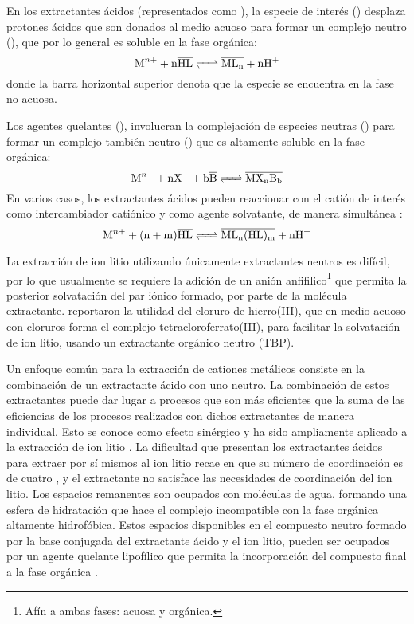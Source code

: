 En los extractantes ácidos (representados como ), la especie de interés () desplaza protones ácidos que son donados al medio acuoso para formar un complejo neutro (), que por lo general es soluble en la fase orgánica:
\begin{equation}
    \ce{M^{n+} + n\overline{HL} <=> \overline{ML_n} + nH^+}
\end{equation}
donde la barra horizontal superior denota que la especie se encuentra en la fase no acuosa. 

Los agentes quelantes (), involucran la complejación de especies neutras () para formar un complejo también neutro () que es altamente soluble en la fase orgánica:
\begin{equation}
    \ce{M^{n+} + nX^{-} + b\overline{B} <=> \overline{MX_nB_b}}
\end{equation}
En varios casos, los extractantes ácidos pueden reaccionar con el catión de interés como intercambiador catiónico y como agente solvatante, de manera simultánea \citep{Swain2016}:
\begin{equation}
    \ce{M^{n+} + (n + m)\overline{HL} <=> \overline{ML_n(HL)_m} + nH^+}
\end{equation}

La extracción de ion litio utilizando únicamente extractantes neutros es difícil, por lo que usualmente se requiere la adición de un anión anfifilico\footnote{Afín a ambas fases: acuosa y orgánica.} que permita la posterior solvatación del par iónico formado, por parte de la molécula extractante. \citet{Zhou2020} reportaron la utilidad del cloruro de hierro(III), que en medio acuoso con cloruros forma el complejo tetracloroferrato(III), para facilitar la solvatación de ion litio, usando un extractante orgánico neutro (TBP).

Un enfoque común para la extracción de cationes metálicos consiste en la combinación de un extractante ácido con uno neutro. La combinación de estos extractantes puede dar lugar a procesos que son más eficientes que la suma de las eficiencias de los procesos realizados con dichos extractantes de manera individual.  Esto se conoce como efecto sinérgico y ha sido ampliamente aplicado a la extracción de ion litio \citep{Pranolo2015, Kunugita1989, Harvianto2016}. La dificultad que presentan los extractantes ácidos para extraer por sí mismos al ion litio recae en que su número de coordinación es de cuatro \citep{Kinugasa1994}, y el extractante no satisface las necesidades de coordinación del ion litio. Los espacios remanentes son ocupados con moléculas de agua, formando una esfera de hidratación que hace el complejo incompatible con la fase orgánica altamente hidrofóbica. Estos espacios disponibles en el compuesto neutro formado por la base conjugada del extractante ácido y el ion litio, pueden ser ocupados por un agente quelante lipofílico que permita la incorporación del compuesto final a la fase orgánica \citep{NARBUTT2020}.

